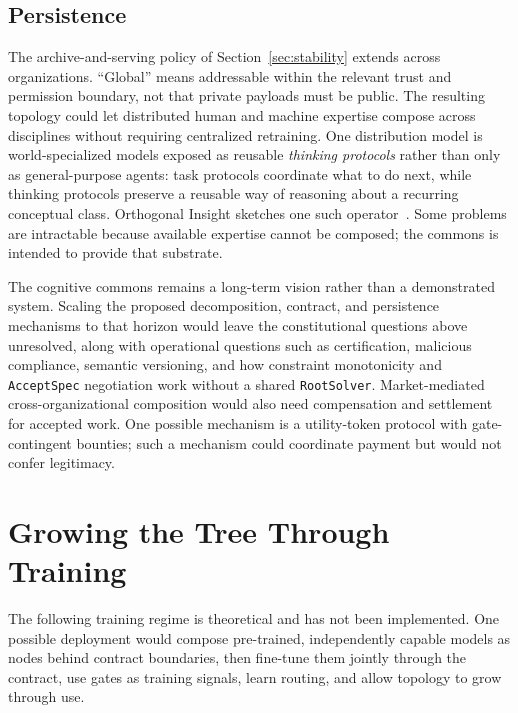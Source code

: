 \documentclass[11pt]{article}
\let\oldtexttt\texttt
\renewcommand{\texttt}[1]{\oldtexttt{\small #1}}
\begin{document}
\subsection{Persistence}

The archive-and-serving policy of Section~\ref{sec:stability} extends across organizations. ``Global'' means addressable within the relevant trust and permission boundary, not that private payloads must be public. The resulting topology could let distributed human and machine expertise compose across disciplines without requiring centralized retraining. One distribution model is world-specialized models exposed as reusable \emph{thinking protocols} rather than only as general-purpose agents: task protocols coordinate what to do next, while thinking protocols preserve a reusable way of reasoning about a recurring conceptual class. Orthogonal Insight sketches one such operator~\cite{westerberg2025strangeworlds}. Some problems are intractable because available expertise cannot be composed; the commons is intended to provide that substrate.

The cognitive commons remains a long-term vision rather than a demonstrated system. Scaling the proposed decomposition, contract, and persistence mechanisms to that horizon would leave the constitutional questions above unresolved, along with operational questions such as certification, malicious compliance, semantic versioning, and how constraint monotonicity and \texttt{AcceptSpec} negotiation work without a shared \texttt{RootSolver}. Market-mediated cross-organizational composition would also need compensation and settlement for accepted work. One possible mechanism is a utility-token protocol with gate-contingent bounties; such a mechanism could coordinate payment but would not confer legitimacy.

\section{Growing the Tree Through Training}
\label{sec:substrate}

The following training regime is theoretical and has not been implemented. One possible deployment would compose pre-trained, independently capable models as nodes behind contract boundaries, then fine-tune them jointly through the contract, use gates as training signals, learn routing, and allow topology to grow through use.
\end{document}
